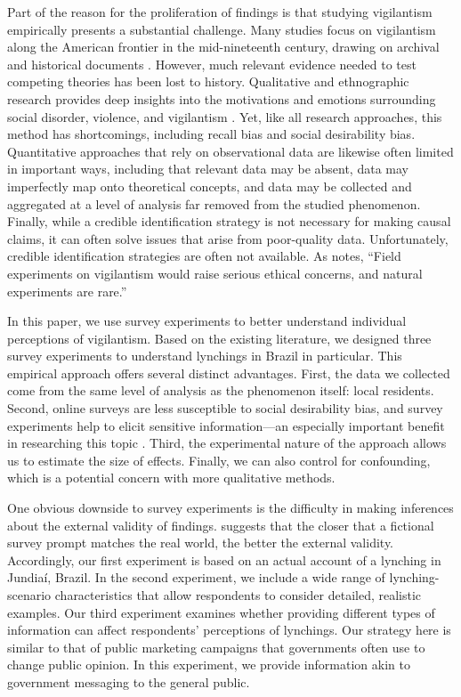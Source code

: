 \documentclass[12pt,ansiapaper]{article}
\begin{document}
Part of the reason for the proliferation of findings is that studying vigilantism empirically presents a substantial challenge. Many studies focus on vigilantism along the American frontier in the mid-nineteenth century, drawing on archival and historical documents  \citep{brown1975strain, courtwright2009violent, obert2018six}. However, much relevant evidence needed to test competing theories has been lost to history. Qualitative and ethnographic research provides deep insights into the motivations and emotions surrounding social disorder, violence, and vigilantism \citep{godoy2002lynchings}. Yet, like all research approaches, this method has shortcomings, including recall bias and social desirability bias. Quantitative approaches that rely on observational data are likewise often limited in important ways, including that relevant data may be absent, data may imperfectly map onto theoretical concepts, and data may be collected and aggregated at a level of analysis far removed from the studied phenomenon. Finally, while a credible identification strategy is not necessary for making causal claims, it can often solve issues that arise from poor-quality data. Unfortunately, credible identification strategies are often not available.  As \citet[17]{bateson2020politics} notes, ``Field experiments on vigilantism would raise serious ethical concerns, and natural experiments are rare.''

In this paper, we use survey experiments to better understand individual perceptions of vigilantism. Based on the existing literature, we designed three survey experiments to understand lynchings in Brazil in particular. This empirical approach offers several distinct advantages. First, the data we collected come from the same level of analysis as the phenomenon itself: local residents. Second, online surveys are less susceptible to social desirability bias, and survey experiments help to elicit sensitive information---an especially important benefit in researching this topic \citep{grimm2010social}. Third, the experimental nature of the approach allows us to estimate the size of effects. Finally, we can also control for confounding, which is a potential concern with more qualitative methods.

One obvious downside to survey experiments is the difficulty in making inferences about the external validity of findings. \citet[17-18]{bateson2020politics} suggests that the closer that a fictional survey prompt matches the real world, the better the external validity. Accordingly, our first experiment is based on an actual account of a lynching in Jundia\'{i}, Brazil. In the second experiment, we include a wide range of lynching-scenario characteristics that allow respondents to consider detailed, realistic examples. Our third experiment examines whether providing different types of information can affect respondents' perceptions of lynchings. Our strategy here is similar to that of public marketing campaigns that governments often use to change public opinion. In this experiment, we provide information akin to government messaging to the general public.
\end{document}
